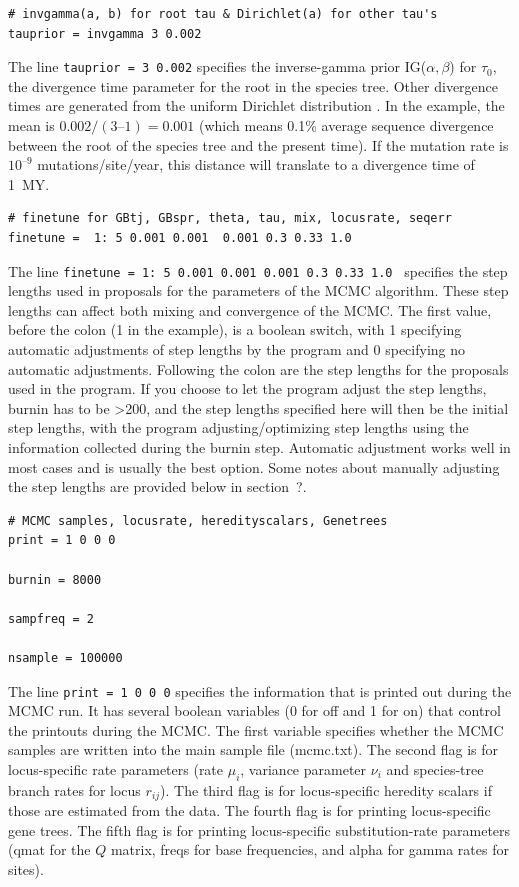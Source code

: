 \documentclass{book}
\numberwithin{equation}{section} \renewcommand{\baselinestretch}{0.55}
\begin{document}
\begin{verbatim}
# invgamma(a, b) for root tau & Dirichlet(a) for other tau's
tauprior = invgamma 3 0.002    
\end{verbatim}
The line \texttt{tauprior = 3 0.002} specifies the inverse-gamma prior
IG($\alpha, \beta$) for $\tau_0$, the divergence time parameter for
the root in the species tree.  Other divergence times are generated
from the uniform Dirichlet distribution \citep[][eq.~2]{Yang2010}. In
the example, the mean is $0.002/(3 – 1) = 0.001$ (which means 0.1\%
average sequence divergence between the root of the species tree and
the present time).  If the mutation rate is $10^{–9}$
mutations/site/year, this distance will translate to a divergence time
of 1~MY.

\begin{verbatim}
# finetune for GBtj, GBspr, theta, tau, mix, locusrate, seqerr
finetune =  1: 5 0.001 0.001  0.001 0.3 0.33 1.0  
\end{verbatim}
The line \texttt{finetune = 1: 5 0.001 0.001 0.001 0.3 0.33 1.0 }
specifies the step lengths used in proposals for the parameters of the
MCMC algorithm. These step lengths can affect both mixing and
convergence of the MCMC. The first value, before the colon (1 in the
example), is a boolean switch, with 1 specifying automatic adjustments
of step lengths by the program and 0 specifying no automatic
adjustments.  Following the colon are the step lengths for the
proposals used in the program.  If you choose to let the program
adjust the step lengths, burnin has to be >200, and the step lengths
specified here will then be the initial step lengths, with the program
adjusting/optimizing step lengths using the information collected
during the burnin step. Automatic adjustment works well in most cases
and is usually the best option.  Some notes about manually adjusting
the step lengths are provided below in section~?.

\begin{verbatim}
# MCMC samples, locusrate, heredityscalars, Genetrees
print = 1 0 0 0   

burnin = 8000

sampfreq = 2

nsample = 100000
\end{verbatim}
The line \texttt{print = 1 0 0 0} specifies the information that is
printed out during the MCMC run. It has several boolean variables (0
for off and 1 for on) that control the printouts during the MCMC.  The
first variable specifies whether the MCMC samples are written into the
main sample file (mcmc.txt).  The second flag is for locus-specific
rate parameters (rate $\mu_i$, variance parameter $\nu_i$ and
species-tree branch rates for locus $r_{ij}$). The third flag is for
locus-specific heredity scalars if those are estimated from the data.
The fourth flag is for printing locus-specific gene trees.  The fifth
flag is for printing locus-specific substitution-rate parameters (qmat
for the $Q$ matrix, freqs for base frequencies, and alpha for gamma
rates for sites).
\end{document}
